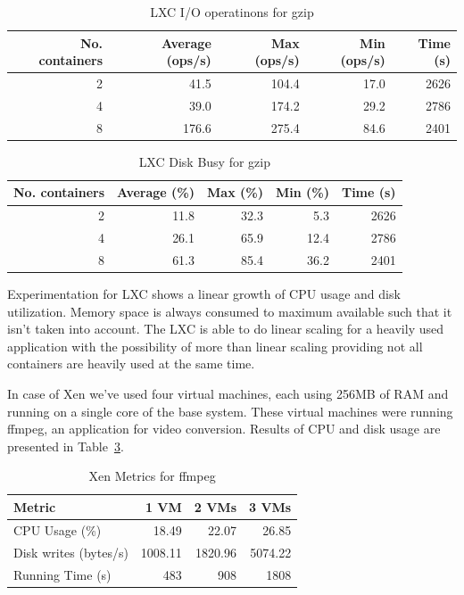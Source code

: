 \begin{table}[ht]
  \centering
  \begin{tabular}{@{}rrrrr@{}}
    \toprule
    \textbf{No. containers} & \textbf{Average (ops/s)} & \textbf{Max (ops/s)} &
    \textbf{Min (ops/s)} & \textbf{Time (s)} \\
    \midrule
    2 & 41.5 & 104.4 & 17.0 & 2626 \\
    4 & 39.0 & 174.2 & 29.2 & 2786 \\
    8 & 176.6 & 275.4 & 84.6 & 2401 \\
    \bottomrule
  \end{tabular}
  \caption{LXC I/O operatinons for gzip}
  \label{table:virt-infra:lxc-io}
\end{table}

\begin{table}[ht]
  \centering
  \begin{tabular}{@{}rrrrr@{}}
    \toprule
    \textbf{No. containers} & \textbf{Average (\%)} & \textbf{Max (\%)} &
    \textbf{Min (\%)} & \textbf{Time (s)} \\
    \midrule
    2 & 11.8 & 32.3 & 5.3 & 2626 \\
    4 & 26.1 & 65.9 & 12.4 & 2786 \\
    8 & 61.3 & 85.4 & 36.2 & 2401 \\
    \bottomrule
  \end{tabular}
  \caption{LXC Disk Busy for gzip}
  \label{table:virt-infra:lxc-disk}
\end{table}

Experimentation for LXC shows a linear growth of CPU usage and disk
utilization. Memory space is always consumed to maximum available such that it
isn't taken into account. The LXC is able to do linear scaling for a heavily
used application with the possibility of more than linear scaling providing
not all containers are heavily used at the same time.

In case of Xen we've used four virtual machines, each using 256MB of RAM and
running on a single core of the base system. These virtual machines were
running ffmpeg, an application for video conversion. Results of CPU and disk
usage are presented in Table~\ref{table:virt-infra:xen-metrics}.

\begin{table}[ht]
  \centering
  \begin{tabular}{@{}lrrr@{}}
    \toprule
    \textbf{Metric} & \textbf{1 VM} & \textbf{2 VMs} & \textbf{3 VMs} \\
    \midrule
    CPU Usage (\%) & 18.49 & 22.07 & 26.85 \\
    Disk writes (bytes/s) & 1008.11 & 1820.96 & 5074.22 \\
    Running Time (s) & 483 & 908 & 1808 \\
    \bottomrule
  \end{tabular}
  \caption{Xen Metrics for ffmpeg}
  \label{table:virt-infra:xen-metrics}
\end{table}

